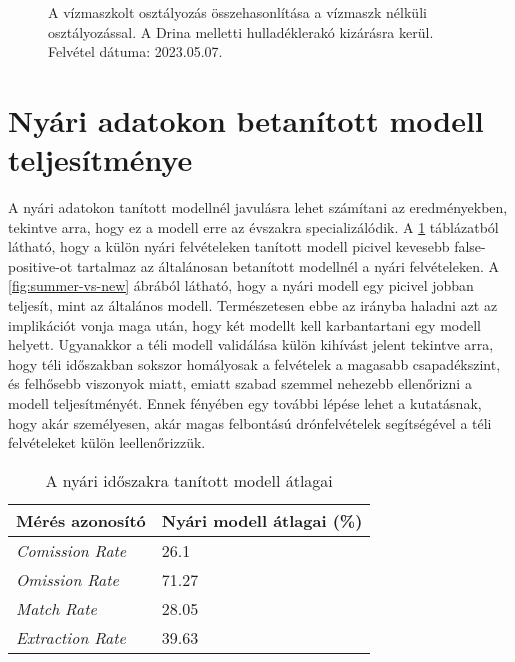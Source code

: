 \begin{figure}[H]
	\centering
	\hspace{5pt}
	\hspace{5pt}
	\caption{A vízmaszkolt osztályozás összehasonlítása a vízmaszk nélküli osztályozással. A Drina melletti hulladéklerakó kizárásra kerül. Felvétel dátuma: 2023.05.07.}
	\label{fig:river-mask-performance}
\end{figure}

\section{Nyári adatokon betanított modell teljesítménye}
\label{ch:summer-winter-models}

A nyári adatokon tanított modellnél javulásra lehet számítani az eredményekben, tekintve arra, hogy ez a modell erre az évszakra specializálódik. A \ref{tab:summer-winter-split} táblázatból látható, hogy a külön nyári felvételeken tanított modell picivel kevesebb false-positive-ot tartalmaz az általánosan betanított modellnél a nyári felvételeken. A \ref{fig:summer-vs-new} ábrából látható, hogy a nyári modell egy picivel jobban teljesít, mint az általános modell. Természetesen ebbe az irányba haladni azt az implikációt vonja maga után, hogy két modellt kell karbantartani egy modell helyett. Ugyanakkor a téli modell validálása külön kihívást jelent tekintve arra, hogy téli időszakban sokszor homályosak a felvételek a magasabb csapadékszint, és felhősebb viszonyok miatt, emiatt szabad szemmel nehezebb ellenőrizni a modell teljesítményét. Ennek fényében egy további lépése lehet a kutatásnak, hogy akár személyesen, akár magas felbontású drónfelvételek segítségével a téli felvételeket külön leellenőrizzük. 

\begin{table}[H]
	\centering
	\begin{tabular}{ | p{} | p{} | }
		\hline
		\textbf{Mérés azonosító} & \textbf{Nyári modell átlagai (\%)} \\
		\hline \hline
		\emph{Comission Rate} & 26.1 \\
		\hline
		\emph{Omission Rate} & 71.27  \\
		\hline
		\emph{Match Rate} & 28.05  \\
		\hline
        \emph{Extraction Rate} & 39.63 \\
		\hline
	\end{tabular}
	\caption{A nyári időszakra tanított modell átlagai}
	\label{tab:summer-winter-split}
\end{table}

